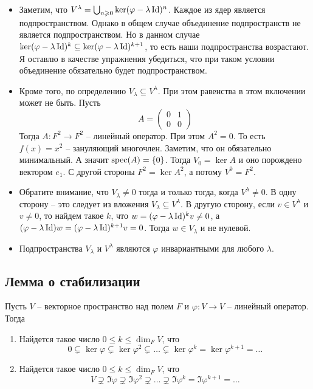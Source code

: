 \begin{itemize}
\item Заметим, что  $V^\lambda=\bigcup_{n\geqslant 0}\ker (\varphi - \lambda \operatorname{Id})^n$.
Каждое из ядер является подпространством.
Однако в общем случае объединение подпространств не является подпространством.
Но в данном случае $\ker(\varphi - \lambda \operatorname{Id})^k\subseteq \ker(\varphi-\lambda \operatorname{Id})^{k+1}$, то есть наши подпространства возрастают.
Я оставлю в качестве упражнения убедиться, что при таком условии объединение обязательно будет подпространством.
 
\item Кроме того, по определению $V_\lambda \subseteq V^\lambda$.
При этом равенства в этом включении может не быть.
Пусть 
\[
A = 
\begin{pmatrix}
{0}&{1}\\
{0}&{0}
\end{pmatrix}
\]
Тогда $A\colon F^2\to F^2$ -- линейный оператор.
При этом $A^2 = 0$.
То есть $f(x) = x^2$ -- зануляющий многочлен.
Заметим, что он обязательно минимальный.
А значит $\operatorname{spec}(A) = \{0\}$.
Тогда $V_0 = \ker A$ и оно порождено вектором $e_1$.
С другой стороны $F^2 = \ker A^2$, а потому $V^0 = F^2$.

\item Обратите внимание, что $V_\lambda \neq 0$ тогда и только тогда, когда $V^\lambda\neq 0$.
В одну сторону -- это следует из вложения $V_\lambda\subseteq V^\lambda$.
В другую сторону, если $v\in V^\lambda$ и $v\neq 0$, то найдем такое $k$, что $w =(\varphi - \lambda\operatorname{Id})^k v \neq 0 $, а $(\varphi - \lambda \operatorname{Id})w = (\varphi - \lambda\operatorname{Id})^{k+1}v =0$.
Тогда $w\in V_\lambda$ и не нулевой.

\item Подпространства $V_\lambda$ и $V^\lambda$ являются $\varphi$ инвариантными для любого $\lambda$.

\end{itemize}


\subsection{Лемма о стабилизации}

\begin{claim}
\label{claim::StabilityLemma}
Пусть $V$ -- векторное пространство над полем $F$ и $\varphi \colon V\to V$ -- линейный оператор.
Тогда
\begin{enumerate}
\item Найдется такое число $0\leqslant k\leqslant \dim_F V$, что
\[
0\subsetneq \ker \varphi \subsetneq \ker \varphi^2\subsetneq \ldots \subsetneq \ker\varphi^k = \ker \varphi^{k+1} = \ldots
\]

\item
Найдется такое число $0\leqslant k\leqslant \dim_F V$, что
\[
 V \supsetneq \Im \varphi \supsetneq \Im \varphi^2 \supsetneq \ldots \supsetneq \Im\varphi^k = \Im \varphi^{k+1} = \ldots
\]
\end{enumerate}
\end{claim}

